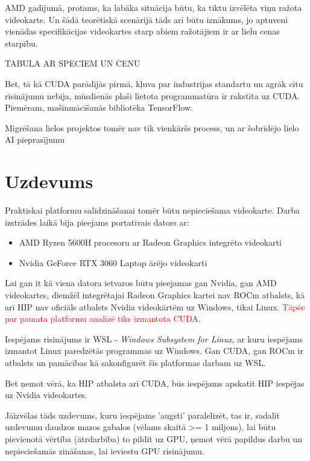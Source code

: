 \documentclass[12pt]{report}%
\theoremstyle{definition}
\begin{document}
AMD gadījumā, protams, ka labāka situācija būtu, ka tiktu izvēlēta viņu ražota videokarte. Un šādā teorētiskā
scenārijā tāds arī būtu iznākums, jo aptuveni vienādas specifikācijas videokartes starp abiem ražotājiem
ir ar lielu cenas starpību.

TABULA AR SPECIEM UN CENU


Bet, tā kā CUDA parādījās pirmā, kļuva par industrijas standartu un agrāk citu risinājumu nebija, 
mūsdienās plaši lietota programmatūra ir rakstīta uz CUDA. Piemēram, mašīnmācīšanās bibliotēka TensorFlow. \cite{tensorflow_github}

Migrēšana lielos projektos tomēr nav tik vienkāršs process, un ar šobrīdējo lielo AI pieprasījumu 


\chapter{Uzdevums}

Praktiskai platformu salīdzināšanai tomēr būtu nepieciešama videokarte.
Darba izstrādes laikā bija pieejams portatīvais dators ar:
\begin{itemize}
  \item AMD Ryzen 5600H procesoru ar Radeon Graphics integrēto videokarti
  \item Nvidia GeForce RTX 3060 Laptop ārējo videokarti
\end{itemize}

Lai gan it kā viena datora ietvaros būtu pieejamas gan Nvidia, gan AMD videokartes, diemžēl
integrētajai Radeon Graphics kartei nav ROCm atbalsts, kā arī HIP nav oficiāls atbalsts 
Nvidia videokārtēm uz Windows, tikai Linux. \textcolor{red}{Tāpēc par pamata platformu analīzē tiks izmantota CUDA.}

Iespējams risinājums ir WSL - \textit{Windows Subsystem for Linux}, ar kuru iespējams izmantot
Linux paredzētās programmas uz Windows. Gan CUDA, gan ROCm ir atbalsts un pamācības kā sakonfigurēt 
šīs platformas darbam uz WSL.\cite{nvidia_wsl_guide,rocm_wsl_guide}







Bet ņemot vērā, ka HIP atbalsta arī CUDA, būs iespējams apskatīt HIP iespējas uz Nvidia videokartes.

Jāizvēlas tāds uzdevums, kuru iespējams 'augsti' paralelizēt, tas ir, sadalīt uzdevumu daudzos mazos gabalos (vēlams skaitā >= 1 miljons),
lai būtu pievienotā vērtība (ātrdarbība) to pildīt uz GPU, ņemot vērā papildus darbu un nepieciešamās zināšanas, lai ieviestu GPU risinājumu.
\end{document}
